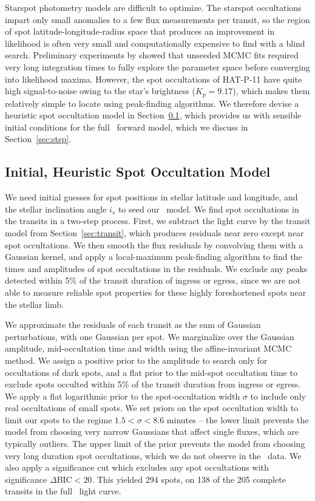 Starspot photometry models are difficult to optimize. The starspot occultations impart only small anomalies to a few flux measurements per transit, so the region of spot latitude-longitude-radius space that produces an improvement in likelihood is often very small and computationally expensive to find with a blind search. Preliminary experiments by \citet{Hebb2017} showed that unseeded MCMC fits required very long integration times to fully explore the parameter space before converging into likelihood maxima. However, the spot occultations of HAT-P-11 have quite high signal-to-noise owing to the star's brightness ($K_p = 9.17$), which makes them relatively simple to locate using peak-finding algorithms. We therefore devise a heuristic spot occultation model in Section~\ref{sec:friedrich}, which provides us with sensible initial conditions for the full \stsp\ forward model, which we discuss in Section~\ref{sec:stsp}.

\subsection{Initial, Heuristic Spot Occultation Model} \label{sec:friedrich}

We need initial guesses for spot positions in stellar latitude and longitude, and the stellar inclination angle $i_s$ to seed our \stsp\ model. We find spot occultations in the transits in a two-step process. First, we subtract the light curve by the transit model from Section~\ref{sec:transit}, which produces residuals near zero except near spot occultations. We then smooth the flux residuals by convolving them with a Gaussian kernel, and apply a local-maximum peak-finding algorithm to find the times and amplitudes of spot occultations in the residuals. We exclude any peaks detected within 5\% of the transit duration of ingress or egress, since we are not able to measure reliable spot properties for these highly foreshortened spots near the stellar limb. 

We approximate the residuals of each transit as the sum of Gaussian perturbations, with one Gaussian per spot. We marginalize over the Gaussian amplitude, mid-occultation time and width using the affine-invariant MCMC method. We assign a positive prior to the amplitude to search only for occultations of dark spots, and a flat prior to the mid-spot occultation time to exclude spots occulted within 5\% of the transit duration from ingress or egress. We apply a flat logarithmic prior to the spot-occultation width $\sigma$ to include only real occultations of small spots. We set priors on the spot occultation width to limit our spots to the regime $1.5 < \sigma < 8.6$ minutes -- the lower limit prevents the model from choosing very narrow Gaussians that affect single fluxes, which are typically outliers. The upper limit of the prior prevents the model from choosing very long duration spot occultations, which we do not observe in the \kepler\ data. We also apply a significance cut which excludes any spot occultations with significance $\Delta$BIC$ < 20$. This yielded 294 spots, on 138 of the 205 complete transits in the full \kepler\ light curve. 

